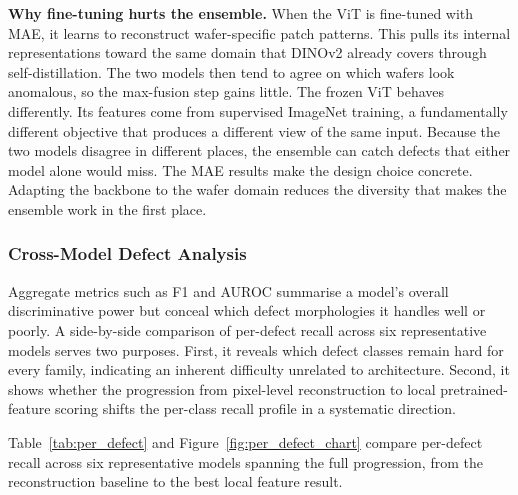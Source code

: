 \documentclass[11pt]{article}
\begin{document}
\textbf{Why fine-tuning hurts the ensemble.} When the ViT is fine-tuned with MAE, it learns to reconstruct wafer-specific patch patterns. This pulls its internal representations toward the same domain that DINOv2 already covers through self-distillation. The two models then tend to agree on which wafers look anomalous, so the max-fusion step gains little. The frozen ViT behaves differently. Its features come from supervised ImageNet training, a fundamentally different objective that produces a different view of the same input. Because the two models disagree in different places, the ensemble can catch defects that either model alone would miss. The MAE results make the design choice concrete. Adapting the backbone to the wafer domain reduces the diversity that makes the ensemble work in the first place.

\subsubsection{Cross-Model Defect Analysis}

Aggregate metrics such as F1 and AUROC summarise a model's overall discriminative power but conceal which defect morphologies it handles well or poorly.
A side-by-side comparison of per-defect recall across six representative models serves two purposes.
First, it reveals which defect classes remain hard for every family, indicating an inherent difficulty unrelated to architecture.
Second, it shows whether the progression from pixel-level reconstruction to local pretrained-feature scoring shifts the per-class recall profile in a systematic direction.

Table~\ref{tab:per_defect} and Figure~\ref{fig:per_defect_chart} compare
per-defect recall across six representative models spanning the full
progression, from the reconstruction baseline to the best local feature result.
\end{document}
